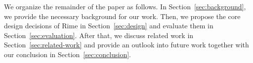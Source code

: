 We organize the remainder of the paper as follows. In Section~\ref{sec:background}, we provide the necessary background for our work. Then, we propose the core design decisions of Rime in Section~\ref{sec:design} and evaluate them in Section~\ref{sec:evaluation}. After that, we discuss related work in Section~\ref{sec:related-work} and provide an outlook into future work together with our conclusion in Section~\ref{sec:conclusion}.
